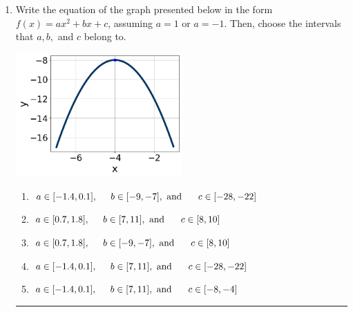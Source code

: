 \documentclass[14pt]{extbook}
\newcommand{\litem}[1]{\item#1\hspace*{-1cm}\rule{\textwidth}{0.4pt}}
\begin{document}
\begin{enumerate}
\litem{
Write the equation of the graph presented below in the form $f(x)=ax^2+bx+c$, assuming  $a=1$ or $a=-1$. Then, choose the intervals that $a, b,$ and $c$ belong to.
\begin{center}
    \includegraphics[width=0.5\textwidth]{../Figures/quadraticGraphToEquationCopyA.png}
\end{center}
\begin{enumerate}[label=\Alph*.]
\item \( a \in [-1.4, 0.1], \hspace*{5mm} b \in [-9, -7], \text{ and } \hspace*{5mm} c \in [-28, -22] \)
\item \( a \in [0.7, 1.8], \hspace*{5mm} b \in [7, 11], \text{ and } \hspace*{5mm} c \in [8, 10] \)
\item \( a \in [0.7, 1.8], \hspace*{5mm} b \in [-9, -7], \text{ and } \hspace*{5mm} c \in [8, 10] \)
\item \( a \in [-1.4, 0.1], \hspace*{5mm} b \in [7, 11], \text{ and } \hspace*{5mm} c \in [-28, -22] \)
\item \( a \in [-1.4, 0.1], \hspace*{5mm} b \in [7, 11], \text{ and } \hspace*{5mm} c \in [-8, -4] \)


\end{enumerate}}
\end{enumerate}
\end{document}

